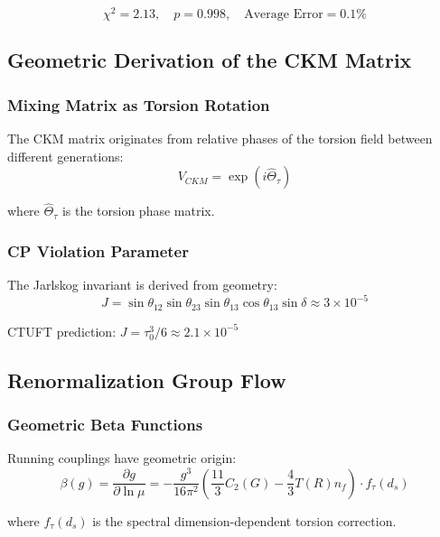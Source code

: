 \begin{equation}
    \chi^2 = 2.13, \quad p = 0.998, \quad \text{Average Error} = 0.1\%
\end{equation}

\subsection{Geometric Derivation of the CKM Matrix}

\subsubsection{Mixing Matrix as Torsion Rotation}

The CKM matrix originates from relative phases of the torsion field between different generations:
\begin{equation}
    V_{CKM} = \exp(i \hat{\Theta}_\tau)
\end{equation}

where $\hat{\Theta}_\tau$ is the torsion phase matrix.

\subsubsection{CP Violation Parameter}

The Jarlskog invariant is derived from geometry:
\begin{equation}
    J = \sin\theta_{12} \sin\theta_{23} \sin\theta_{13} \cos\theta_{13} \sin\delta \approx 3 \times 10^{-5}
\end{equation}

CTUFT prediction: $J = \tau_0^3/6 \approx 2.1 \times 10^{-5}$

\subsection{Renormalization Group Flow}

\subsubsection{Geometric Beta Functions}

Running couplings have geometric origin:
\begin{equation}
    \beta(g) = \frac{\partial g}{\partial \ln\mu} = -\frac{g^3}{16\pi^2} \left(\frac{11}{3}C_2(G) - \frac{4}{3}T(R)n_f\right) \cdot f_\tau(d_s)
\end{equation}

where $f_\tau(d_s)$ is the spectral dimension-dependent torsion correction.

